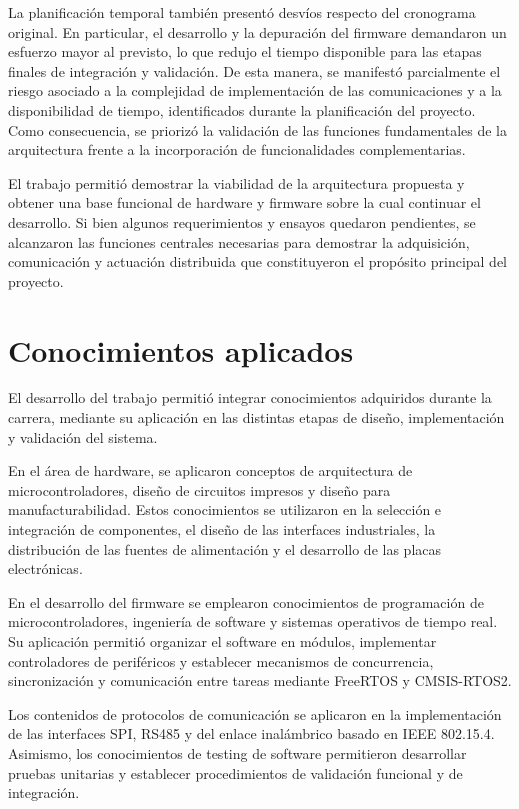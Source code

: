 La planificación temporal también presentó desvíos respecto del cronograma original. En particular, el desarrollo y la depuración del firmware demandaron un esfuerzo mayor al previsto, lo que redujo el tiempo disponible para las etapas finales de integración y validación. De esta manera, se manifestó parcialmente el riesgo asociado a la complejidad de implementación de las comunicaciones y a la disponibilidad de tiempo, identificados durante la planificación del proyecto. Como consecuencia, se priorizó la validación de las funciones fundamentales de la arquitectura frente a la incorporación de funcionalidades complementarias.

El trabajo permitió demostrar la viabilidad de la arquitectura propuesta y obtener una base funcional de hardware y firmware sobre la cual continuar el desarrollo. Si bien algunos requerimientos y ensayos quedaron pendientes, se alcanzaron las funciones centrales necesarias para demostrar la adquisición, comunicación y actuación distribuida que constituyeron el propósito principal del proyecto.

\section{Conocimientos aplicados}

El desarrollo del trabajo permitió integrar conocimientos adquiridos durante la carrera, mediante su aplicación en las distintas etapas de diseño, implementación y validación del sistema.

En el área de hardware, se aplicaron conceptos de arquitectura de microcontroladores, diseño de circuitos impresos y diseño para manufacturabilidad. Estos conocimientos se utilizaron en la selección e integración de componentes, el diseño de las interfaces industriales, la distribución de las fuentes de alimentación y el desarrollo de las placas electrónicas.

En el desarrollo del firmware se emplearon conocimientos de programación de microcontroladores, ingeniería de software y sistemas operativos de tiempo real. Su aplicación permitió organizar el software en módulos, implementar controladores de periféricos y establecer mecanismos de concurrencia, sincronización y comunicación entre tareas mediante FreeRTOS y CMSIS-RTOS2.

Los contenidos de protocolos de comunicación se aplicaron en la implementación de las interfaces SPI, RS485 y del enlace inalámbrico basado en IEEE 802.15.4. Asimismo, los conocimientos de testing de software permitieron desarrollar pruebas unitarias y establecer procedimientos de validación funcional y de integración.


